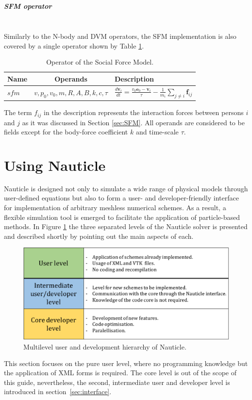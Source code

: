 \documentclass[a4paper,12pt,openany]{book}
\newcommand{\mysubparagraph}[1]{\subparagraph{#1}\mbox{}\\}
\theoremstyle{break}
\begin{document}
\mysubparagraph{SFM operator}
Similarly to the N-body and DVM operators, the SFM implementation is also covered by a single operator shown by Table \ref{tbl:SFM_op}.
\begin{table} [h!]
\begin{center}
\caption{Operator of the Social Force Model.} \label{tbl:SFM_op}
\begin{tabular}{ l c l }
\toprule[1.5pt]
\bf Name & \bf Operands & \bf Description \\ 
\midrule
$sfm$ & $v,p_0,v_0,m,R,A,B,k,c,\tau$ & $\frac{d\textbf{v}_i}{dt}=\frac{v_0\textbf{e}_0-\textbf{v}_i}{\tau}-\frac{1}{m_i}\sum_{j\neq i}{\textbf{f}_{ij}}$ \\
\bottomrule[1.25pt]
\end{tabular}
\end{center}
\end{table}
The term $f_{ij}$ in the description represents the interaction forces between persons $i$ and $j$ as it was discussed in Section \ref{sec:SFM}. All operands are considered to be fields except for the body-force coefficient $k$ and time-scale $\tau$.


\section{Using Nauticle} \label{sec:usage_of_nauticle}
Nauticle is designed not only to simulate a wide range of physical models through user-defined equations but also to form a user- and developer-friendly interface for implementation of arbitrary meshless numerical schemes. As a result, a flexible simulation tool is emerged to facilitate the application of particle-based methods. In Figure \ref{fig:three_levels} the three separated levels of the Nauticle solver is presented and described shortly by pointing out the main aspects of each.
\begin{figure}[H]
  \includegraphics[scale=0.55]{three_levels.pdf}
  \centering
  \caption{Multilevel user and development hierarchy of Nauticle.}
  \label{fig:three_levels}
\end{figure}
This section focuses on the pure user level, where no programming knowledge but the application of XML forms is required. The core level is out of the scope of this guide, nevertheless, the second, intermediate user and developer level is introduced in section \ref{sec:interface}. 
\end{document}
